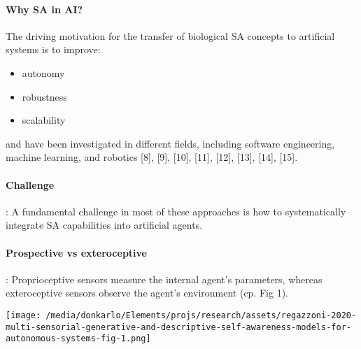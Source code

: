 \documentclass{article}
\begin{document}
			\paragraph{Why SA in AI?} The driving motivation for the transfer of biological SA concepts
			to artificial systems is to improve:
			\begin{itemize}
				\item autonomy
				\item robustness
				\item scalability
			\end{itemize}
			and have been investigated in different fields, including software engineering, machine learning, and robotics \citet{regazzoni-2020-multi-sensorial-generative-and-descriptive-self-awareness-models-for-autonomous-systems}[8],
			\citet{regazzoni-2020-multi-sensorial-generative-and-descriptive-self-awareness-models-for-autonomous-systems}[9], \citet{regazzoni-2020-multi-sensorial-generative-and-descriptive-self-awareness-models-for-autonomous-systems}[10], \citet{regazzoni-2020-multi-sensorial-generative-and-descriptive-self-awareness-models-for-autonomous-systems}[11], \citet{regazzoni-2020-multi-sensorial-generative-and-descriptive-self-awareness-models-for-autonomous-systems}[12], \citet{regazzoni-2020-multi-sensorial-generative-and-descriptive-self-awareness-models-for-autonomous-systems}[13], \citet{regazzoni-2020-multi-sensorial-generative-and-descriptive-self-awareness-models-for-autonomous-systems}[14], \citet{regazzoni-2020-multi-sensorial-generative-and-descriptive-self-awareness-models-for-autonomous-systems}[15]. 
			\paragraph{Challenge}: A fundamental challenge in most of these approaches is how to systematically integrate SA capabilities into artificial agents.
		
		\paragraph{Prospective vs exteroceptive}: Proprioceptive sensors measure the internal agent's parameters, whereas exteroceptive sensors observe the agent's environment (cp. \cite{regazzoni-2020-multi-sensorial-generative-and-descriptive-self-awareness-models-for-autonomous-systems} Fig 1).
		
		\begin{figure*}
			\centering
			\texttt{[image: /media/donkarlo/Elements/projs/research/assets/regazzoni-2020-multi-sensorial-generative-and-descriptive-self-awareness-models-for-autonomous-systems-fig-1.png]}
			\caption{\citet{regazzoni-2020-multi-sensorial-generative-and-descriptive-self-awareness-models-for-autonomous-systems}}
			\label{fig:regazzoni-2020-multi-sensorial-generative-and-descriptive-self-awareness-models-for-autonomous-systems-fig-1.jpg}
		\end{figure*}
		
\end{document}
